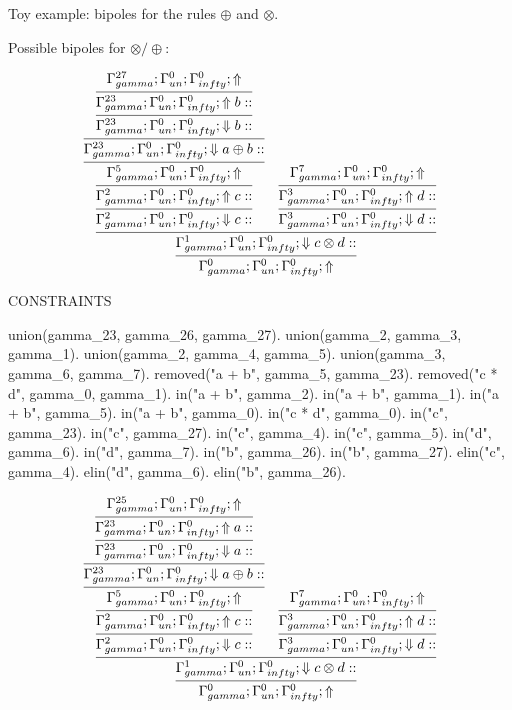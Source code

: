 \documentclass[a4paper, 11pt]{article}
\begin{document}
Toy example: bipoles for the rules $\oplus$ and $\otimes$.

Possible bipoles for $\otimes/\oplus$:

\[
\infer{\Gamma_{ gamma}^{0} ; \Gamma_{un}^{0} ; \Gamma_{ infty}^{0} ;  \Uparrow }
{\infer{\Gamma_{ gamma}^{1} ; \Gamma_{un}^{0} ; \Gamma_{ infty}^{0} ;  \Downarrow c \otimes d :: }
{\infer{\Gamma_{ gamma}^{2} ; \Gamma_{un}^{0} ; \Gamma_{ infty}^{0} ;  \Downarrow c :: }
{\infer{\Gamma_{ gamma}^{2} ; \Gamma_{un}^{0} ; \Gamma_{ infty}^{0} ;  \Uparrow c :: }
{\infer{\Gamma_{ gamma}^{5} ; \Gamma_{un}^{0} ; \Gamma_{ infty}^{0} ;  \Uparrow }
{\infer{\Gamma_{ gamma}^{23} ; \Gamma_{un}^{0} ; \Gamma_{ infty}^{0} ;  \Downarrow a \oplus b :: }
{\infer{\Gamma_{ gamma}^{23} ; \Gamma_{un}^{0} ; \Gamma_{ infty}^{0} ;  \Downarrow b :: }
{\infer{\Gamma_{ gamma}^{23} ; \Gamma_{un}^{0} ; \Gamma_{ infty}^{0} ;  \Uparrow b :: }
{\Gamma_{ gamma}^{27} ; \Gamma_{un}^{0} ; \Gamma_{ infty}^{0} ;  \Uparrow }}}}}}
&
\infer{\Gamma_{ gamma}^{3} ; \Gamma_{un}^{0} ; \Gamma_{ infty}^{0} ;  \Downarrow d :: }
{\infer{\Gamma_{ gamma}^{3} ; \Gamma_{un}^{0} ; \Gamma_{ infty}^{0} ;  \Uparrow d :: }
{\Gamma_{ gamma}^{7} ; \Gamma_{un}^{0} ; \Gamma_{ infty}^{0} ;  \Uparrow }}}}
\]
 
CONSTRAINTS 

union(gamma\_23, gamma\_26, gamma\_27).
union(gamma\_2, gamma\_3, gamma\_1).
union(gamma\_2, gamma\_4, gamma\_5).
union(gamma\_3, gamma\_6, gamma\_7).
removed("a + b", gamma\_5, gamma\_23).
removed("c * d", gamma\_0, gamma\_1).
in("a + b", gamma\_2).
in("a + b", gamma\_1).
in("a + b", gamma\_5).
in("a + b", gamma\_0).
in("c * d", gamma\_0).
in("c", gamma\_23).
in("c", gamma\_27).
in("c", gamma\_4).
in("c", gamma\_5).
in("d", gamma\_6).
in("d", gamma\_7).
in("b", gamma\_26).
in("b", gamma\_27).
elin("c", gamma\_4).
elin("d", gamma\_6).
elin("b", gamma\_26).

\[
\infer{\Gamma_{ gamma}^{0} ; \Gamma_{un}^{0} ; \Gamma_{ infty}^{0} ;  \Uparrow }
{\infer{\Gamma_{ gamma}^{1} ; \Gamma_{un}^{0} ; \Gamma_{ infty}^{0} ;  \Downarrow c \otimes d :: }
{\infer{\Gamma_{ gamma}^{2} ; \Gamma_{un}^{0} ; \Gamma_{ infty}^{0} ;  \Downarrow c :: }
{\infer{\Gamma_{ gamma}^{2} ; \Gamma_{un}^{0} ; \Gamma_{ infty}^{0} ;  \Uparrow c :: }
{\infer{\Gamma_{ gamma}^{5} ; \Gamma_{un}^{0} ; \Gamma_{ infty}^{0} ;  \Uparrow }
{\infer{\Gamma_{ gamma}^{23} ; \Gamma_{un}^{0} ; \Gamma_{ infty}^{0} ;  \Downarrow a \oplus b :: }
{\infer{\Gamma_{ gamma}^{23} ; \Gamma_{un}^{0} ; \Gamma_{ infty}^{0} ;  \Downarrow a :: }
{\infer{\Gamma_{ gamma}^{23} ; \Gamma_{un}^{0} ; \Gamma_{ infty}^{0} ;  \Uparrow a :: }
{\Gamma_{ gamma}^{25} ; \Gamma_{un}^{0} ; \Gamma_{ infty}^{0} ;  \Uparrow }}}}}}
&
\infer{\Gamma_{ gamma}^{3} ; \Gamma_{un}^{0} ; \Gamma_{ infty}^{0} ;  \Downarrow d :: }
{\infer{\Gamma_{ gamma}^{3} ; \Gamma_{un}^{0} ; \Gamma_{ infty}^{0} ;  \Uparrow d :: }
{\Gamma_{ gamma}^{7} ; \Gamma_{un}^{0} ; \Gamma_{ infty}^{0} ;  \Uparrow }}}}
\]
 
\end{document}
